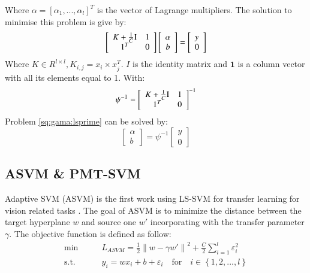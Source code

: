 Where $\alpha = [ \alpha_1,...,\alpha_l]^T $ is the vector of Lagrange multipliers. The solution to minimise this problem is give by:
\begin{equation}
  \left[ {\begin{array}{*{20}{c}}
{K  + \frac{1}{C}{\rm I}}\\
1^T
\end{array}\begin{array}{*{20}{c}}
1\\
0
\end{array}} \right]\left[ {\begin{array}{*{20}{c}}
\alpha \\
b
\end{array}} \right] = \left[ \begin{array}{l}
y\\
0
\end{array} \right]
\end{equation}
Where $K \in R^{l \times l},K_{i,j}=x_i \times x_j^T$. $I$ is the identity matrix and $\mathbf{1}$ is a column vector with all its elements equal to 1. With:
\begin{equation}\label{eq:gama:psi}
\psi^{-1} = \left[ {\begin{array}{*{20}{c}}
{K  + \frac{1}{C}{\rm I}}\\
1^T
\end{array}\begin{array}{*{20}{c}}
1\\
0
\end{array}} \right]^{-1}
\end{equation}
Problem \eqref{sq:gama:lsprime} can be solved by:
\begin{equation}
\left[ {\begin{array}{*{20}{c}}
\alpha \\
b
\end{array}} \right] = \psi^{-1}\left[ \begin{array}{l}
y\\
0
\end{array} \right]
\end{equation}
\subsection{ASVM \& PMT-SVM}
Adaptive SVM (ASVM) is the first work using LS-SVM for transfer learning for vision related tasks \cite{yang2007adapting}. The goal of ASVM is to minimize the distance between the target hyperplane $w$ and source one $w'$ incorporating with the transfer parameter $\gamma$. The objective function is defined as follow:
\begin{equation}\label{eq:gama:asvm}
\begin{aligned}
\min \qquad& L_{ASVM} = \frac{1}{2}{\left\| w - \gamma w' \right\|^2} + \frac{C}{2}\sum\limits_{i = 1}^l {{\varepsilon_i ^2}}\\
\text{s.t.}\qquad&{y_i} = w{x_i} + b + {\varepsilon _i} \quad   \text{for} \quad i \in \left\{ {1,2,...,l} \right\}
\end{aligned}
\end{equation}

